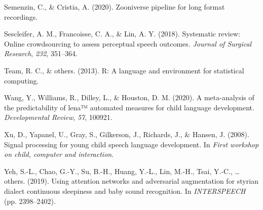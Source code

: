 \documentclass[english,,man,floatsintext]{apa6}
\begin{document}
\leavevmode\hypertarget{ref-semenzin2020zooniverse}{}%
Semenzin, C., \& Cristia, A. (2020). Zooniverse pipeline for long format recordings.

\leavevmode\hypertarget{ref-sescleifer2018systematic}{}%
Sescleifer, A. M., Francoisse, C. A., \& Lin, A. Y. (2018). Systematic review: Online crowdsourcing to assess perceptual speech outcomes. \emph{Journal of Surgical Research}, \emph{232}, 351--364.

\leavevmode\hypertarget{ref-team2013r}{}%
Team, R. C., \& others. (2013). R: A language and environment for statistical computing.

\leavevmode\hypertarget{ref-wang2020meta}{}%
Wang, Y., Williams, R., Dilley, L., \& Houston, D. M. (2020). A meta-analysis of the predictability of lena™ automated measures for child language development. \emph{Developmental Review}, \emph{57}, 100921.

\leavevmode\hypertarget{ref-xu2008signal}{}%
Xu, D., Yapanel, U., Gray, S., Gilkerson, J., Richards, J., \& Hansen, J. (2008). Signal processing for young child speech language development. In \emph{First workshop on child, computer and interaction}.

\leavevmode\hypertarget{ref-yeh2019using}{}%
Yeh, S.-L., Chao, G.-Y., Su, B.-H., Huang, Y.-L., Lin, M.-H., Tsai, Y.-C., \ldots{} others. (2019). Using attention networks and adversarial augmentation for styrian dialect continuous sleepiness and baby sound recognition. In \emph{INTERSPEECH} (pp. 2398--2402).
\end{document}
